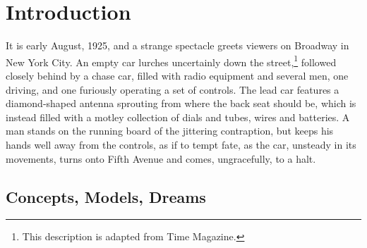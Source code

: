 \chapter{Introduction}
\label{chap:0}



It is early August, 1925, and a strange spectacle greets viewers on
Broadway in New York City. An empty car lurches uncertainly down the
street,\footnote{This description is adapted from Time
  Magazine\cite{???-Science-radio-auto}.} followed closely behind by a
chase car, filled with radio equipment and several men, one driving,
and one furiously operating a set of controls. The lead car features a
diamond-shaped antenna sprouting from where the back seat should be,
which is instead filled with a motley collection of dials and tubes,
wires and batteries. A man stands on the running board of the
jittering contraption, but keeps his
hands well away from the controls, as if to tempt fate, as the car,
unsteady in its movements, turns onto Fifth Avenue and comes,
ungracefully, to a halt.

\section{Concepts, Models, Dreams}

